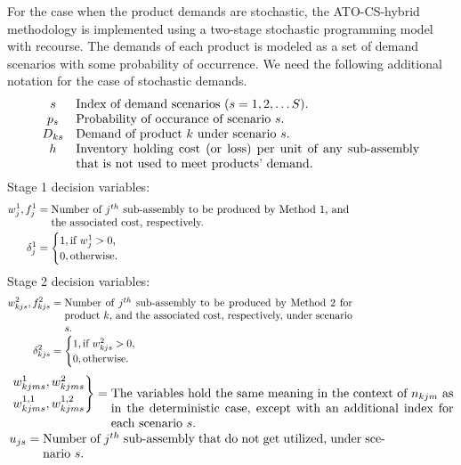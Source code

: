 \documentclass[twoside,onecolumn,12pt,letterpaper]{article}
\begin{document}
For the case when the product demands are stochastic, the ATO-CS-hybrid methodology is implemented using a two-stage stochastic programming model with recourse. The demands of each product is modeled as a set of demand scenarios with some probability of occurrence. We need the following additional notation for the case of stochastic demands.
\begin{align*}
\begin{matrix}
s & \parbox[t]{0.8\textwidth}{Index of demand scenarios ($s=1,2,\ldots S$).} \\
p_s & \parbox[t]{0.8\textwidth}{Probability of occurance of scenario $s$.} \\
D_{ks} & \parbox[t]{0.8\textwidth}{Demand of product $k$ under scenario $s$.} \\
h & \parbox[t]{0.8\textwidth}{Inventory holding cost (or loss) per unit of any sub-assembly that is not used to meet products' demand.}
\end{matrix}
\end{align*}
Stage 1 decision variables:
\begin{align*}
w_{j}^{1}, f_{j}^{1} & = \parbox[t]{0.8\textwidth}{Number of $j^{th}$ sub-assembly to be produced by Method 1, and the associated cost, respectively.} \\
\delta_{j}^{1} &=
\begin{cases}
1, \parbox[t]{\textwidth}{if $w_{j}^{1}>0$,}\\
0, \parbox[t]{\textwidth}{otherwise.}
\end{cases}
\end{align*}
Stage 2 decision variables:
\begin{align*}
w_{kjs}^{2}, f_{kjs}^{2} & = \parbox[t]{0.8\textwidth}{Number of $j^{th}$ sub-assembly to be produced by Method 2 for product $k$, and the associated cost, respectively, under scenario $s$.} \\
\delta_{kjs}^{2} &=
\begin{cases}
1, \parbox[t]{\textwidth}{if $w_{kjs}^{2}>0$,}\\
0, \parbox[t]{0\textwidth}{otherwise.}
\end{cases}
\end{align*}
\setlength{\abovedisplayskip}{-6 pt}
\begin{align*}
& \begin{rcases}
w_{kjms}^{1}, w_{kjms}^{2} \\
w_{kjms}^{1,1}, w_{kjms}^{1,2}
\end{rcases} = \parbox[t]{0.8\textwidth}{The variables hold the same meaning in the context of $n_{kjm}$ as in the deterministic case, except with an additional index for each scenario $s$.} \\
& u_{js} = \parbox[t]{0.8\textwidth}{Number of $j^{th}$ sub-assembly that do not get utilized, under scenario $s$.}
\end{align*}
\end{document}
